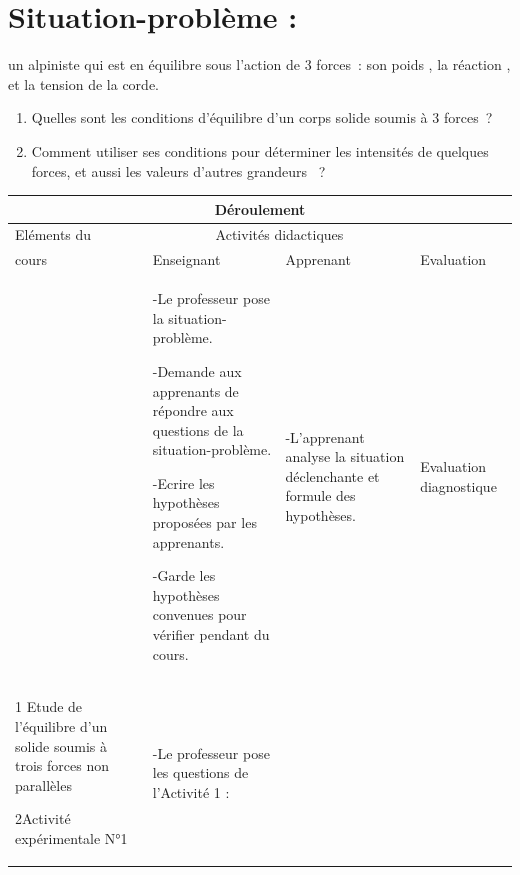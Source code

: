 \documentclass[12pt]{article}
\begin{document}
\section*{Situation-problème :}
un alpiniste qui est en équilibre sous
l’action de 3 forces : son poids , la réaction , et la tension de la corde.

\begin{enumerate}
\item Quelles sont les conditions d’équilibre d’un corps solide
soumis à 3 forces ?
\item Comment utiliser ses conditions pour déterminer les intensités
de quelques forces, et aussi les valeurs d’autres grandeurs  ?
\end{enumerate}

\begin{center}
	 \begin{tabular}{|p{}||p{}||p{}||p{}|}
\hline
\multicolumn{4}{|c|}{Déroulement}\\\hline
Eléments du & \multicolumn{2}{c||}{Activités didactiques} &  \\\cline{2-3}
cours & Enseignant & Apprenant & Evaluation\\\hline

\color{red}{I-Introduction}	  &
-Le professeur pose la situation-problème.

-Demande aux apprenants de répondre aux questions de la situation-problème.

-Ecrire les hypothèses proposées par les apprenants.

-Garde les hypothèses convenues pour vérifier pendant
du cours.
				  &
				  -L’apprenant analyse la situation déclenchante
et formule des hypothèses.

				  &
				  Evaluation
diagnostique\\\hline


\color{red}{II Conditions d’équilibre d’un corps solide sous
l’action de trois forces non parallèles : }

\vspace{0.5cm}
\color{blue}1 Etude de l’équilibre d’un solide soumis à trois forces
non parallèles

\vspace{0.5cm}

\color{blue}2Activité expérimentale N°1
\vspace{0.5cm}


				  &
-Le professeur pose les questions de l'Activité 1 : 



\end{tabular}
\end{center}
\end{document}
